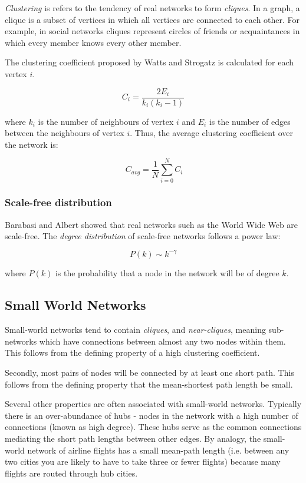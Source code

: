 \documentclass[a4paper,11pt,titlepage]{article}
\begin{document}
\emph{Clustering} is refers to the tendency of real networks to form
\emph{cliques}. In a graph, a clique is a subset of vertices in which all
vertices are connected to each other. For example, in social networks
cliques represent circles of friends or acquaintances in which every
member knows every other member.

The clustering coefficient proposed by Watts and Strogatz is calculated for each
vertex $i$.

\[ C_i = \frac{2E_i}{k_i(k_i-1)} \]

where $k_i$ is the number of neighbours of vertex $i$ and $E_i$ is the number
of edges between the neighbours of vertex $i$. Thus, the average clustering
coefficient over the network is:

\[ \ C_{avg} = \frac{1}{N}\sum_{i=0}^{N} C_i \]

\subsubsection{Scale-free distribution}
\label{sec:scale-free}

Barabasi and Albert showed that real networks such as the World Wide Web are
scale-free. The \emph{degree distribution} of scale-free networks follows a
power law:

\[ P(k) \sim k^{-\gamma} \]

where $P(k)$ is the probability that a node in the network will be of degree $k$.

\subsection{Small World Networks}

Small-world networks tend to contain \emph{cliques}, and \emph{near-cliques}, meaning sub-networks which have connections between almost any two nodes within them. This follows from the defining property of a high clustering coefficient. 

Secondly, most pairs of nodes will be connected by at least one short path. This follows from the defining property that the mean-shortest path length be small.

Several other properties are often associated with small-world networks. Typically there is an over-abundance of hubs - nodes in the network with a high number of connections (known as high degree). These hubs serve as the common connections mediating the short path lengths between other edges. By analogy, the small-world network of airline flights has a small mean-path length (i.e. between any two cities you are likely to have to take three or fewer flights) because many flights are routed through hub cities. \cite{smnet}
\end{document}
